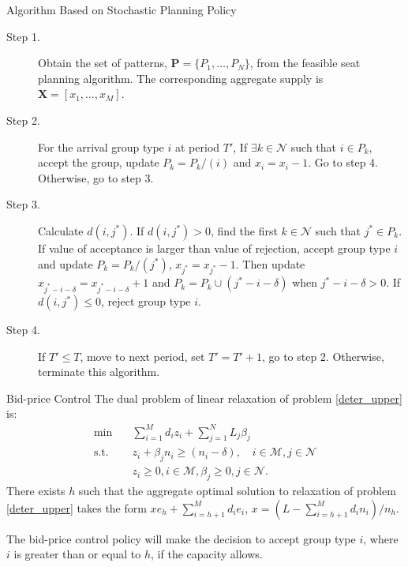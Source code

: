     \begin{frame}{Algorithm Based on Stochastic Planning Policy}
        \begin{description}
          \item[Step 1.] Obtain the set of patterns, $\mathbf{P} = \{P_1,\ldots,P_{N}\}$, from the feasible seat planning algorithm. The corresponding aggregate supply is $\mathbf{X} = [x_{1}, \ldots, x_{M}]$.
          \item[Step 2.] For the arrival group type $i$ at period $T{'}$, 
          If $\exists k \in \mathcal{N}$ such that $i \in P_k$, accept the group, update $P_{k} = P_{k}/(i)$ and $x_{i} = x_{i} -1$. Go to step 4. Otherwise, go to step 3.
          \item[Step 3.] Calculate $d(i,j^{*})$. If $d(i,j^{*})>0$, find the first $k \in \mathcal{N}$ such that $j^{*} \in P_k$. If value of acceptance is larger than value of rejection, accept group type $i$ and update $P_{k} = P_{k}/(j^{*})$, $x_{j^{*}} = x_{j^{*}} -1$. Then update $x_{j^{*}-i-\delta} = x_{j^{*}-i-\delta} + 1$ and $P_{k}= P_{k} \cup (j^{*}-i-\delta)$ when $j^{*}-i-\delta > 0$. If $d(i,j^{*}) \leq 0$, reject group type $i$.
          \item[Step 4.] If $T{'} \leq T$, move to next period, set $T{'} = T{'}+1$, go to step 2. Otherwise, terminate this algorithm.
        \end{description}
      \end{frame}
      
      \begin{frame}{Bid-price Control}
        The dual problem of linear relaxation of problem \eqref{deter_upper} is:
        \begin{equation}\label{bid-price_dual}
          \begin{aligned}
          \min \quad & \sum_{i=1}^{M} d_i z_i + \sum_{j= 1}^{N} L_j \beta_{j} \\
          \text {s.t.} \quad & z_{i} + \beta_j n_i \geq (n_i-\delta), \quad i \in \mathcal{M}, j \in \mathcal{N} \\
          & z_{i} \geq 0, i \in \mathcal{M}, \beta_{j} \geq 0, j \in \mathcal{N}.
          \end{aligned}
        \end{equation}
        \small There exists $h$ such that the aggregate optimal solution to relaxation of problem \eqref{deter_upper} takes the form $x e_{h} + \sum_{i=h+1} ^{M} d_{i} e_{i}$, $x = (L- \sum_{i = h+1}^{M} {d_i n_i})/ n_h$.

        The bid-price control policy will make the decision to accept group type $i$, where $i$ is greater than or equal to $h$, if the capacity allows.
      \end{frame}

